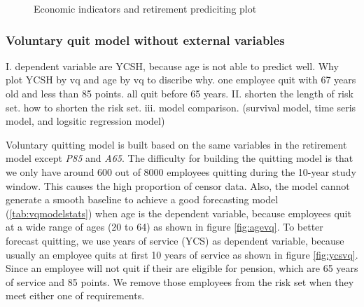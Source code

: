 \documentclass[12pt,letterpaper]{article}
\begin{document}
\begin{figure}[h!]
	\centering
	\caption{Economic indicators and retirement prediciting plot}
	\label{fig:EIndex}
\end{figure}

\subsubsection{Voluntary quit model without external variables}

I. dependent variable are YCSH, because age is not able to predict well. Why plot YCSH by vq and age by vq to discribe why.
one employee quit with 67 years old and less than 85 points. all quit before 65 years.
II. shorten the length of risk set. how to shorten the risk set.
iii. model comparison. (survival model, time seris model, and logsitic regression model)

Voluntary quitting model is built based on the same variables in the retirement model except {\it P85} and {\it A65}. The difficulty for building the quitting model is that we only have around 600 out of 8000 employees quitting during the 10-year study window. This causes the high proportion of censor data. Also, the model cannot generate a smooth baseline to achieve a good forecasting model (\ref{tab:vqmodelstats}) when age is the dependent variable, because employees quit at a wide range of ages (20 to 64) as shown in figure \ref{fig:agevq}. To better forecast quitting, we use years of service (YCS) as dependent variable, because usually an employee quits at first 10 years of service as shown in figure \ref{fig:ycsvq}. Since an employee will not quit if their are eligible for pension, which are 65 years of service and 85 points. We remove those employees from the risk set when they meet either one of requirements.
\end{document}
